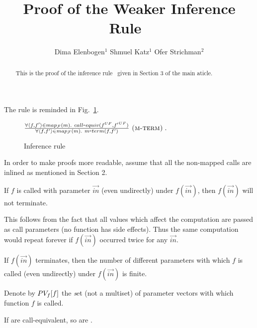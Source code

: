 \documentclass{llncs}
\begin{document}
\title{Proof of the Weaker Inference Rule\mbox{\ \mtermd}}


\author{
Dima Elenbogen$^1$ \quad
Shmuel Katz$^1$\quad
Ofer Strichman$^2$
}

\newcommand\bpar[1]{{\bf #1} }
\maketitle

\begin{abstract}
This is the proof of the inference rule\mbox{\ \mtermd} given in Section 3 of the main aticle.
\end{abstract}

The rule is reminded in Fig.~\ref{fig:rule}.
\begin{figure}%
{\large $\frac
{\forall \langle f, f'\rangle \in map_{\cal F}(m).\ call\mbox{-}equiv({f}^{UF},{f'}^{UF})}
{\forall \langle f, f'\rangle \in map_{\cal F}(m).\ m\mbox{-}term(f, f')}
\mbox{\ {\sc (m-term)}} \;.
$}
\label{fig:rule}
\caption{Inference rule\mbox{\ \mtermd}}
\end{figure}

In order to make proofs more readable, assume that all the non-mapped calls are inlined as mentioned in Section 2.

\begin{lemma}If $f$ is called with parameter $\vec{in}$ (even undirectly) under $f(\vec{in})$, then $f(\vec{in})$ will not terminate.
\end{lemma}
This follows from the fact that all values which affect the computation are passed as call parameters (no function has side effects). Thus the same computation would repeat forever if $f(\vec{in})$ occurred twice for any $\vec{in}$.

\begin{lemma}If $f(\vec{in})$ terminates, then the number of different parameters with which $f$ is called (even undirectly) under $f(\vec{in})$ is finite.
\end{lemma}

Denote by $PV_f[f]$ the {\emph set} (not a multiset) of parameter vectors with which function $f$ is called.

\begin{lemma}If  are call-equivalent, so are .
\end{lemma}
\end{document}
